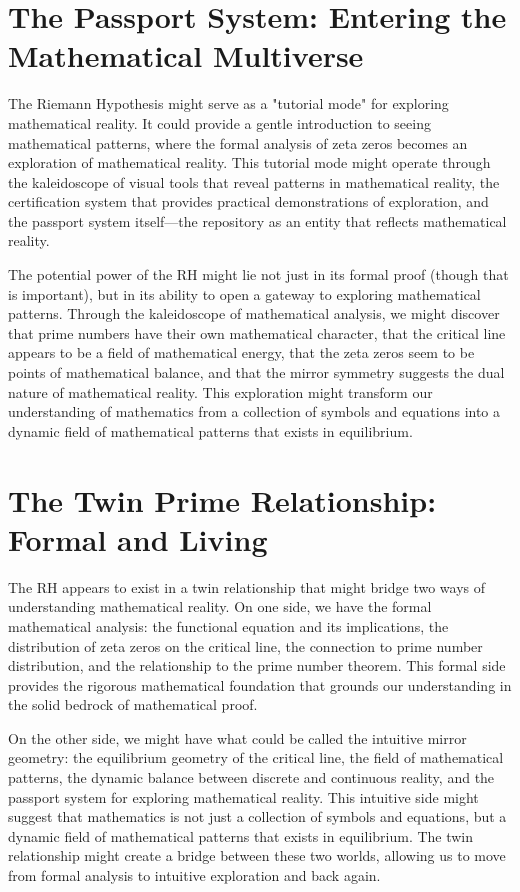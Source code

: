 \documentclass{article}
\begin{document}
\section{The Passport System: Entering the Mathematical Multiverse}

The Riemann Hypothesis might serve as a "tutorial mode" for exploring mathematical reality. It could provide a gentle introduction to seeing mathematical patterns, where the formal analysis of zeta zeros becomes an exploration of mathematical reality. This tutorial mode might operate through the kaleidoscope of visual tools that reveal patterns in mathematical reality, the certification system that provides practical demonstrations of exploration, and the passport system itself—the repository as an entity that reflects mathematical reality.

The potential power of the RH might lie not just in its formal proof (though that is important), but in its ability to open a gateway to exploring mathematical patterns. Through the kaleidoscope of mathematical analysis, we might discover that prime numbers have their own mathematical character, that the critical line appears to be a field of mathematical energy, that the zeta zeros seem to be points of mathematical balance, and that the mirror symmetry suggests the dual nature of mathematical reality. This exploration might transform our understanding of mathematics from a collection of symbols and equations into a dynamic field of mathematical patterns that exists in equilibrium.

\section{The Twin Prime Relationship: Formal and Living}

The RH appears to exist in a twin relationship that might bridge two ways of understanding mathematical reality. On one side, we have the formal mathematical analysis: the functional equation and its implications, the distribution of zeta zeros on the critical line, the connection to prime number distribution, and the relationship to the prime number theorem. This formal side provides the rigorous mathematical foundation that grounds our understanding in the solid bedrock of mathematical proof.

On the other side, we might have what could be called the intuitive mirror geometry: the equilibrium geometry of the critical line, the field of mathematical patterns, the dynamic balance between discrete and continuous reality, and the passport system for exploring mathematical reality. This intuitive side might suggest that mathematics is not just a collection of symbols and equations, but a dynamic field of mathematical patterns that exists in equilibrium. The twin relationship might create a bridge between these two worlds, allowing us to move from formal analysis to intuitive exploration and back again.
\end{document}
